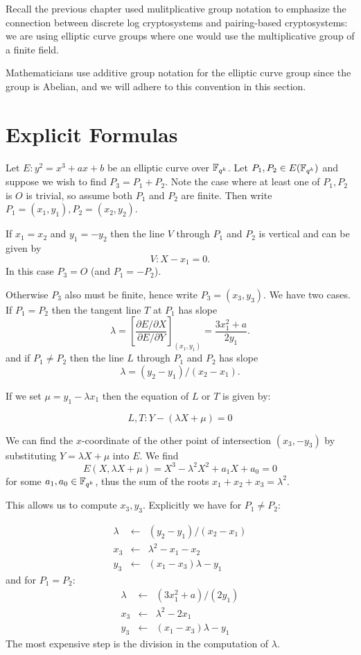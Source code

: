 Recall the previous chapter used mulitplicative group notation to emphasize
the connection
between discrete log cryptosystems and pairing-based cryptosystems:
we are using elliptic curve groups where one would use
the multiplicative group of a finite field.

Mathematicians use additive group notation for the elliptic curve group
since the group is Abelian, and we will adhere to this convention in this
section.

\section {Explicit Formulas}

Let $E: y^2 = x^3 + ax + b$ be an elliptic curve over $\mathbb{F}_{q^k}$. Let
$P_1, P_2 \in E(\mathbb{F}_{q^k})$ and suppose
we wish to find $P_3 = P_1 + P_2$.
Note the case where at least one of $P_1, P_2$ is $O$ is trivial,
so assume both $P_1$ and $P_2$ are finite.
Then write $P_1 = (x_1, y_1), P_2 = (x_2, y_2)$.

If $x_1 = x_2$ and $y_1 = -y_2$
then the line $V$ through $P_1$ and $P_2$ is vertical and
can be given by
\[ V : X - x_1 = 0  . \]
In this case $P_3 = O$ (and $P_1 = -P_2$).

Otherwise $P_3$ also must be finite, hence write $P_3 = (x_3, y_3)$.
We have two cases. If $P_1 = P_2$ then the tangent line $T$ at
$P_1$
has slope
\[\lambda =
\left[ \frac{\partial E / \partial X}{\partial E/ \partial Y} \right]_{(x_1,y_1)}
= \frac{3x_1^2 + a}{2y_1} . \]
and if $P_1 \ne P_2$ then the line $L$ through $P_1$ and $P_2$ has slope
\[ \lambda = (y_2 - y_1)/(x_2 - x_1) . \]

If we set $\mu = y_1 - \lambda x_1$ then
the equation of $L$ or $T$ is given by:

\[ L, T :  Y - (\lambda X + \mu) = 0 \]

We can find the $x$-coordinate of the other point of intersection $(x_3, -y_3)$
by substituting $Y = \lambda X + \mu$ into $E$. We find
\[ E(X, \lambda X+\mu) = X^3 - \lambda^2 X^2 + a_1 X + a_0 = 0 \]
for some $a_1, a_0 \in \mathbb{F}_{q^k}$, thus the sum of the roots
$x_1 + x_2 + x_3 = \lambda^2$.

This allows us to compute $x_3, y_3$. Explicitly we have for $P_1 \ne P_2$:

\[
\begin{array}{rcl}
\lambda &\gets& (y_2 - y_1)/(x_2 - x_1) \\
x_3 &\gets& \lambda^2 - x_1 - x_2 \\
y_3 &\gets& (x_1 - x_3) \lambda - y_1
\end{array}
\]
and for $P_1 = P_2$:
\[
\begin{array}{rcl}
\lambda &\gets& (3x_1^2 + a)/(2y_1) \\
x_3 &\gets& \lambda^2 - 2x_1 \\
y_3 &\gets& (x_1 - x_3) \lambda - y_1
\end{array}
\]
The most expensive step is the division in the computation of
$\lambda$.

